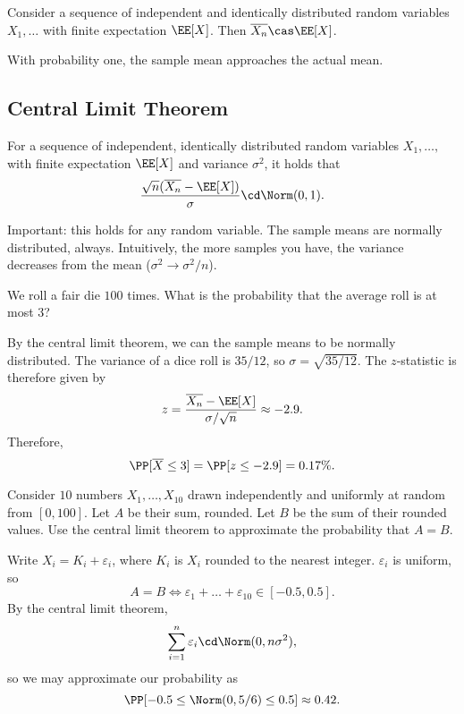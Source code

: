 \begin{theorem}

Consider a sequence of independent and identically distributed random variables $X_1, \hdots$ with finite expectation $\EE[X]$. Then $\overline{X_n}\cas \EE[X]$. 
\end{theorem}

With probability one, the sample mean approaches the actual mean. 

\subsection{Central Limit Theorem}

\begin{theorem}

For a sequence of independent, identically distributed random variables $X_1, \hdots,$ with finite expectation $\EE[X]$ and variance $\sigma^2$, it holds that 
\[\frac{\sqrt{n}(\overline{X_n} - \EE[X])}{\sigma} \cd \Norm(0,1).\]
\end{theorem}

Important: this holds for any random variable. The sample means are normally distributed, always. Intuitively, the more samples you have, the variance decreases from the mean ($\sigma^2\rightarrow \sigma^2/n$). 

\begin{example}
\exlabel

We roll a fair die $100$ times. What is the probability that the average roll is at most $3$?
\end{example}

By the central limit theorem, we can the sample means to be normally distributed. The variance of a dice roll is $35/12$, so $\sigma = \sqrt{35/12}$. The $z$-statistic is therefore given by 
\[z = \frac{\overline{X_n} - \EE[X]}{\sigma/\sqrt{n}} \approx -2.9.\]
Therefore,
\[\PP[\overline{X}\leq 3] = \PP[z \leq -2.9] = 0.17\%.\]

\begin{example}
\exlabel

Consider $10$ numbers $X_1, \hdots, X_{10}$ drawn independently and uniformly at random from $[0,100]$. Let $A$ be their sum, rounded. Let $B$ be the sum of their rounded values. Use the central limit theorem to approximate the probability that $A=B$. 
\end{example}

Write $X_i = K_i+\varepsilon_i$, where $K_i$ is $X_i$ rounded to the nearest integer. $\varepsilon_i$ is uniform, so 
\[A=B \iff \varepsilon_1 + \hdots + \varepsilon_{10} \in [-0.5, 0.5].\]
By the central limit theorem, 
\[\sum_{i=1}^{n}\varepsilon_i\cd \Norm(0, n\sigma^2),\]
so we may approximate our probability as 
\[\PP[-0.5 \leq \Norm(0, 5/6)\leq 0.5] \approx 0.42.\]

